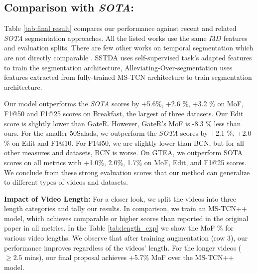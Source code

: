 \documentclass[10pt,twocolumn,letterpaper]{article}
\begin{document}
\subsection{Comparison with \textit{SOTA}:}\label{subsec:sota_comparison}
Table \ref{tab:final result} compares our performance against recent and related \textit{SOTA} segmentation approaches. All the listed works use the same $I3D$ features and evaluation splits. There are few other works on temporal segmentation which are not directly comparable \cite{ishikawa2021alleviating, selfsupervised-chen2020action}. SSTDA \cite{selfsupervised-chen2020action} uses self-supervised task's adapted features to train the segmentation architecture, Alleviating-Over-segmentation \cite{ishikawa2021alleviating} uses features extracted from fully-trained MS-TCN\cite{farha2019ms} architecture to train segmentation architecture. 

Our model outperforms the \textit{SOTA} scores by +5.6\%, +2.6 \%, +3.2 \% on MoF, F1@50 and F1@25 scores on Breakfast, the largest of three datasets. Our Edit score is slightly lower than 
GateR\cite{wang2020gated}. However, GateR's MoF is -8.3 \% less than ours.  For the smaller 50Salads, we outperform the \textit{SOTA} scores by +2.1 \%, +2.0 \% on Edit and F1@10.  For F1@50, we are slightly lower than BCN\cite{wang2020boundary}, but for all other measures and datasets, BCN is worse.
On GTEA, we outperform SOTA scores on all metrics with +1.0\%, 2.0\%, 1.7\% on MoF, Edit, and F1@25 scores.  We conclude from these strong evaluation scores that our method can generalize to different types of videos and datasets. 

\textbf{Impact of Video Length:} For a closer look, we split the videos into three length categories and tally our results.  In comparison, we train an MS-TCN++\cite{li2020ms} model, which achieves comparable or higher scores than reported in the original paper in all metrics. In the Table \ref{tab:length_exp} we show the MoF $\%$ for various video lengths.  We observe that after training augmentation (row 3), our performance improves regardless of the videos' length. For the longer videos ($\geq 2.5$ mins), our final proposal achieves +5.7\% MoF over the MS-TCN++ model.
\end{document}

